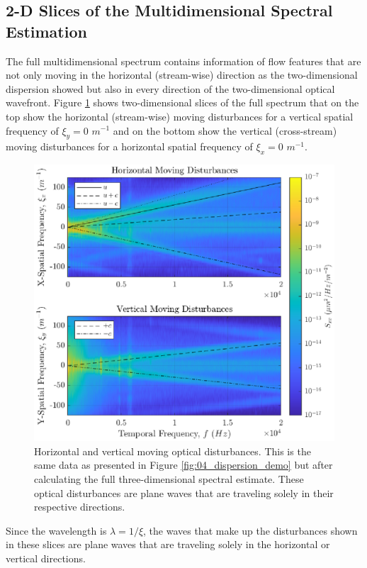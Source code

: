 \subsection{2-D Slices of the Multidimensional Spectral Estimation}
The full multidimensional spectrum contains information of flow features that are not only moving in the horizontal (stream-wise) direction as the two-dimensional dispersion showed but also in every direction of the two-dimensional optical wavefront.
Figure \ref{fig:04_dispersion_xy} shows two-dimensional slices of the full spectrum that on the top show the horizontal (stream-wise) moving disturbances for a vertical spatial frequency of $\xi_y=0$ $m^{-1}$ and on the bottom show the vertical (cross-stream) moving disturbances for a horizontal spatial frequency of $\xi_x=0$ $m^{-1}$.
\begin{figure}
  \centering
  \includegraphics{../matlab/04_dispersion_analysis/dispersion_xy.eps}
  \caption{Horizontal and vertical moving optical disturbances. This is the same data as presented in Figure \ref{fig:04_dispersion_demo} but after calculating the full three-dimensional spectral estimate. These optical disturbances are plane waves that are traveling solely in their respective directions.}
  \label{fig:04_dispersion_xy}
\end{figure}
Since the wavelength is $\lambda=1/\xi$, the waves that make up the disturbances shown in these slices are plane waves that are traveling solely in the horizontal or vertical directions.

